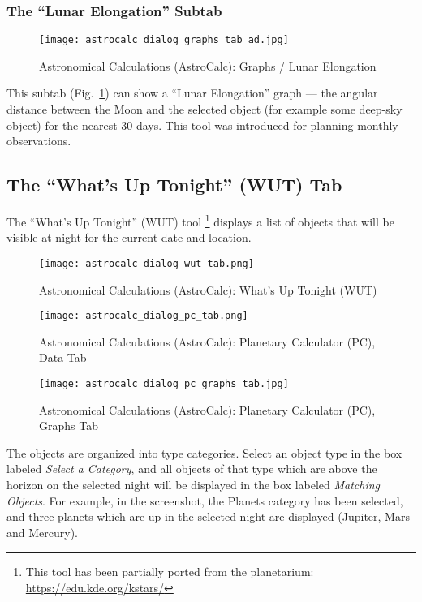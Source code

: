 \subsubsection{The ``Lunar Elongation'' Subtab}
\label{sec:gui:AstroCalc:Graphs:LE}

\begin{figure}[p]
\centering\texttt{[image: astrocalc\_dialog\_graphs\_tab\_ad.jpg]}
\caption{Astronomical Calculations (AstroCalc): Graphs / Lunar Elongation}
\label{fig:gui:AstroCalc:Graphs:LE}
\end{figure}

This subtab (Fig.~\ref{fig:gui:AstroCalc:Graphs:LE})
 can show a ``Lunar Elongation''
graph --- the angular distance between the Moon
and the selected object (for example some deep-sky object) for the
nearest 30 days. This tool was introduced for planning monthly
observations.

\subsection{The ``What's Up Tonight'' (WUT) Tab}
\label{sec:gui:AstroCalc:WUT}

The ``What's Up Tonight'' (WUT) tool%
	\footnote{This tool has been partially ported from the  planetarium: \url{https://edu.kde.org/kstars/}}
 displays a list of objects that will be visible at night for the current date and location.

\begin{figure}[p]
\centering\texttt{[image: astrocalc\_dialog\_wut\_tab.png]}
\caption{Astronomical Calculations (AstroCalc): What's Up Tonight (WUT)}
\label{fig:gui:AstroCalc:WUT}
\end{figure}

\begin{figure}[p]
\centering\texttt{[image: astrocalc\_dialog\_pc\_tab.png]}
\caption{Astronomical Calculations (AstroCalc): Planetary Calculator (PC), Data Tab}
\label{fig:gui:AstroCalc:PC:Data}
\end{figure}
\begin{figure}[p]
\centering\texttt{[image: astrocalc\_dialog\_pc\_graphs\_tab.jpg]}
\caption{Astronomical Calculations (AstroCalc): Planetary Calculator (PC), Graphs Tab}
\label{fig:gui:AstroCalc:PC:Graphs}
\end{figure}

The objects are organized into type categories. Select an object type in the box labeled 
\emph{Select a Category}, and all objects of that type which are above the horizon on the selected night 
will be displayed in the box labeled \emph{Matching Objects}. For example, in the screenshot, 
the Planets category has been selected, and three planets which are up in the selected night are displayed (Jupiter, Mars and Mercury). 

